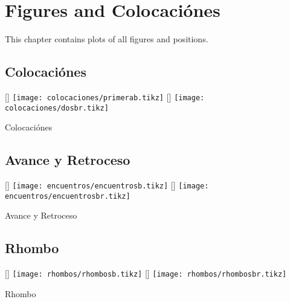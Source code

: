 \iffalse

\FloatBarrier
\chapter{Figures and Colocaciónes}
\label{chap:figs_collocations}

This chapter contains plots of all figures and positions.

\section{Colocaciónes}
\label{sec:colocaciones}

\begin{minipage}{\linewidth}
	\captionsetup{type=figure}
	[\ahalf\linewidth]
	{\texttt{[image: colocaciones/primerab.tikz]}}
	\hspace*{\fill}
	[\ahalf\linewidth]
	{\texttt{[image: colocaciones/dosbr.tikz]}}
	\caption{Colocaciónes}
	\label{fig:colocaciones}
\end{minipage}

\section{Avance y Retroceso}
\label{sec:encuentro}

\begin{minipage}{\linewidth}
	\captionsetup{type=figure}
	[\ahalf\linewidth]
	{\texttt{[image: encuentros/encuentrosb.tikz]}}
	\hspace*{\fill}
	[\ahalf\linewidth]
	{\texttt{[image: encuentros/encuentrosbr.tikz]}}
	\caption{Avance y Retroceso}
	\label{fig:encuentro}
\end{minipage}

\section{Rhombo}
\label{sec:rhombo}

\begin{minipage}{\linewidth}
	\captionsetup{type=figure}
	[\ahalf\linewidth]
	{\texttt{[image: rhombos/rhombosb.tikz]}}
	\hspace*{\fill}
	[\ahalf\linewidth]
	{\texttt{[image: rhombos/rhombosbr.tikz]}}
	\caption{Rhombo}
	\label{fig:rhombo}
\end{minipage}

